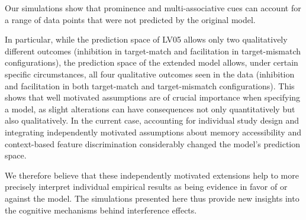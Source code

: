 \documentclass{cambridge7A}\usepackage[]{graphicx}\usepackage[]{color}
\newcommand{\revFE}[1]{#1}
\begin{document}
% 
Our simulations show that prominence and multi-associative cues can account for a range of data points that were not predicted by the original model. 
\revFE{
In particular, while the prediction space of LV05 allows only two qualitatively different outcomes (inhibition in target-match and facilitation in target-mismatch configurations), the prediction space of the extended model allows, under certain specific circumstances, all four qualitative outcomes seen in the data (inhibition and facilitation in both target-match and target-mismatch configurations). 
This shows that well motivated assumptions are of crucial importance when specifying a model, as slight alterations can have consequences not only quantitatively but also qualitatively.
In the current case, accounting for individual study design and integrating independently motivated assumptions about memory accessibility and context-based feature discrimination considerably changed the model's prediction space.
}
We therefore believe that these independently motivated extensions help to more precisely interpret individual empirical results as being evidence in favor of or against the model. 
The simulations presented here thus provide new insights into the cognitive mechanisms behind interference effects.
\end{document}
